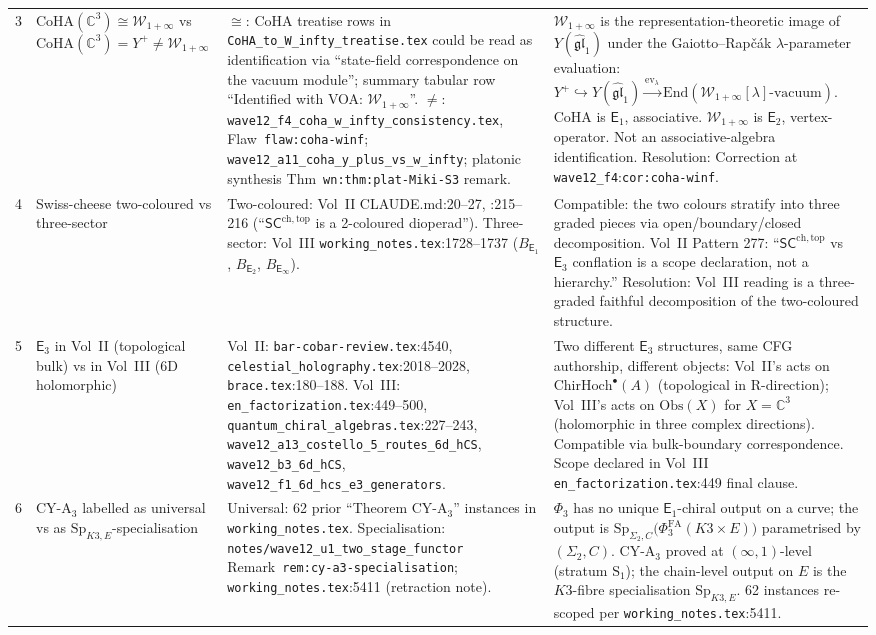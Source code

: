 \documentclass[11pt]{article}
\theoremstyle{definition}
\theoremstyle{remark}
\providecommand{\C}{\mathbb{C}}
\providecommand{\fgl}{\mathfrak{gl}}
\providecommand{\Sp}{\mathrm{Sp}}
\providecommand{\Phifa}{\Phi^{\mathrm{FA}}}
\providecommand{\ChirHoch}{\mathrm{ChirHoch}}
\providecommand{\Eone}{\mathsf{E}_1}
\providecommand{\Etwo}{\mathsf{E}_2}
\providecommand{\Ethree}{\mathsf{E}_3}
\providecommand{\Einf}{\mathsf{E}_\infty}
\providecommand{\CoHA}{\mathrm{CoHA}}
\providecommand{\Winf}{\mathcal{W}_{1+\infty}}
\providecommand{\Yplus}{Y^{+}}
\providecommand{\Yhat}{Y(\widehat{\fgl}_1)}
\begin{document}
\begin{longtable}{@{}p{0.7cm}p{4.8cm}p{4.4cm}p{4.8cm}@{}}
3 & $\CoHA(\C^3) \cong \Winf$ vs $\CoHA(\C^3) = \Yplus\neq\Winf$
& $\cong$: CoHA treatise rows in \texttt{CoHA\_to\_W\_infty\_treatise.tex}
could be read as identification via ``state-field correspondence on
the vacuum module''; summary tabular row ``Identified with VOA:
$\Winf$''.
$\neq$: \texttt{wave12\_f4\_coha\_w\_infty\_consistency.tex},
Flaw~\texttt{flaw:coha-winf};
\texttt{wave12\_a11\_coha\_y\_plus\_vs\_w\_infty};
platonic synthesis Thm~\texttt{wn:thm:plat-Miki-S3} remark.
& $\Winf$ is the representation-theoretic image of $\Yhat$ under
the Gaiotto--Rap\v{c}\'ak $\lambda$-parameter evaluation:
$\Yplus\hookrightarrow\Yhat\xrightarrow{\mathrm{ev}_\lambda}
\mathrm{End}(\Winf[\lambda]\text{-vacuum})$. CoHA is $\Eone$,
associative. $\Winf$ is $\Etwo$, vertex-operator. Not an
associative-algebra identification. Resolution: Correction at
\texttt{wave12\_f4}:\texttt{cor:coha-winf}.
\\[0.3ex]

4 & Swiss-cheese two-coloured vs three-sector
& Two-coloured: Vol~II CLAUDE.md:20--27, :215--216 (``$\mathsf{SC}^{\mathrm{ch,top}}$
is a 2-coloured dioperad'').
Three-sector: Vol~III \texttt{working\_notes.tex}:1728--1737
($B_{\Eone}$, $B_{\Etwo}$, $B_{\Einf}$).
& Compatible: the two colours stratify into three graded pieces via
open/boundary/closed decomposition. Vol~II Pattern 277:
``$\mathsf{SC}^{\mathrm{ch,top}}$ vs $\Ethree$ conflation is a scope
declaration, not a hierarchy.'' Resolution: Vol~III reading is a
three-graded faithful decomposition of the two-coloured structure.
\\[0.3ex]

5 & $\Ethree$ in Vol~II (topological bulk) vs in Vol~III (6D
holomorphic)
& Vol~II: \texttt{bar-cobar-review.tex}:4540,
\texttt{celestial\_holography.tex}:2018--2028,
\texttt{brace.tex}:180--188.
Vol~III: \texttt{en\_factorization.tex}:449--500,
\texttt{quantum\_chiral\_algebras.tex}:227--243,
\texttt{wave12\_a13\_costello\_5\_routes\_6d\_hCS},
\texttt{wave12\_b3\_6d\_hCS}, \texttt{wave12\_f1\_6d\_hcs\_e3\_generators}.
& Two different $\Ethree$ structures, same CFG authorship, different
objects: Vol~II's acts on $\ChirHoch^\bullet(A)$ (topological in
R-direction); Vol~III's acts on $\mathrm{Obs}(X)$ for $X = \C^3$
(holomorphic in three complex directions). Compatible via
bulk-boundary correspondence. Scope declared in Vol~III
\texttt{en\_factorization.tex}:449 final clause.
\\[0.3ex]

6 & CY-A$_3$ labelled as universal vs as $\Sp_{K3,E}$-specialisation
& Universal: 62 prior ``Theorem CY-A$_3$'' instances in
\texttt{working\_notes.tex}.
Specialisation: \texttt{notes/wave12\_u1\_two\_stage\_functor}
Remark~\texttt{rem:cy-a3-specialisation};
\texttt{working\_notes.tex}:5411 (retraction note).
& $\Phi_3$ has no unique $\Eone$-chiral output on a curve; the
output is
$\Sp_{\Sigma_2,C}\bigl(\Phifa_3(K3\times E)\bigr)$
parametrised by $(\Sigma_2,C)$. CY-A$_3$ proved at $(\infty,1)$-level
(stratum $\mathrm{S}_1$); the chain-level output on $E$ is the
$K3$-fibre specialisation $\Sp_{K3,E}$.
62 instances re-scoped per \texttt{working\_notes.tex}:5411.
\\[0.3ex]


\end{longtable}
\end{document}
